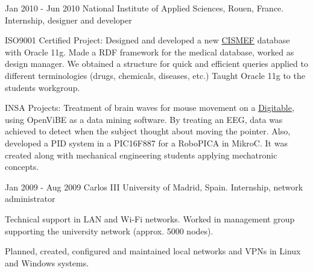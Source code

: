 \experience
  {Jan 2010 - Jun 2010}
  {National Institute of Applied Sciences, Rouen, France.}
  {Internship, designer and developer}
  {\vspace{-1em}\begin{rlist}
    \item ISO9001 Certified Project: Designed and developed a new \href{http://www.cismef.org}{CISMEF}
    database with Oracle 11g. Made a RDF
    framework for the medical database, worked as design manager. We obtained a
    structure for quick and efficient queries applied to different
    terminologies (drugs, chemicals, diseases, etc.)
    Taught Oracle 11g to the students workgroup.
    \item INSA Projects: Treatment of brain waves for mouse movement on a \href{http://digitable.imag.fr/}{Digitable},
    using OpenViBE as a data mining software. By treating an EEG, data was achieved to detect when the subject 
    thought about moving the pointer. Also, developed a PID system in a PIC16F887 for a RoboPICA in MikroC. It 
    was created along with mechanical engineering students applying mechatronic concepts. 
  \end{rlist}}

\experience
  {Jan 2009 - Aug 2009}
  {Carlos III University of Madrid, Spain.}
  {Internship, network administrator}
  {\vspace{-1em}\begin{rlist}
    \item Technical support in LAN and Wi-Fi networks. Worked in management
    group supporting the university network (approx. 5000 nodes).
    \item Planned, created, configured and maintained local networks and
    VPNs in Linux and Windows systems.
  \end{rlist}}
